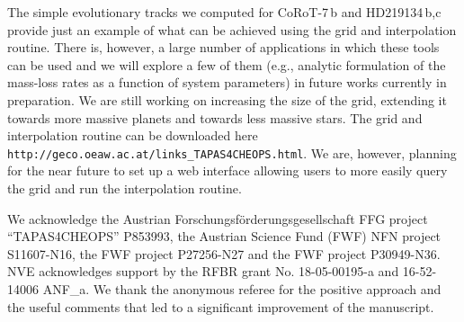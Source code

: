 \documentclass{aa}
\begin{document}
The simple evolutionary tracks we computed for CoRoT-7\,b and
HD219134\,b,c provide just an example of what can be achieved
using the grid and interpolation routine. There is, however, a
large number of applications in which these tools can be used and
we will explore a few of them (e.g., analytic formulation of the
mass-loss rates as a function of system parameters) in future
works currently in preparation. We are still working on increasing
the size of the grid, extending it towards more massive planets
and towards less massive stars. {The grid and interpolation
routine can be downloaded here {\tt
http://geco.oeaw.ac.at/links\_TAPAS4CHEOPS.html}. We are, however,
planning for the near future to set up a web interface allowing
users to more easily query the grid and run the interpolation
routine.}
%
\begin{acknowledgements}
%
We acknowledge the Austrian Forschungsf\"orderungsgesellschaft FFG
project ``TAPAS4CHEOPS'' P853993, the Austrian Science Fund (FWF)
NFN project S11607-N16, the FWF project P27256-N27 and the FWF
project P30949-N36. NVE acknowledges support by the RFBR grant No.
18-05-00195-a and 16-52-14006 ANF\_a. We thank the anonymous
referee for the positive approach and the useful comments that led
to a significant improvement of the manuscript.
%
\end{acknowledgements}
%
\end{document}
